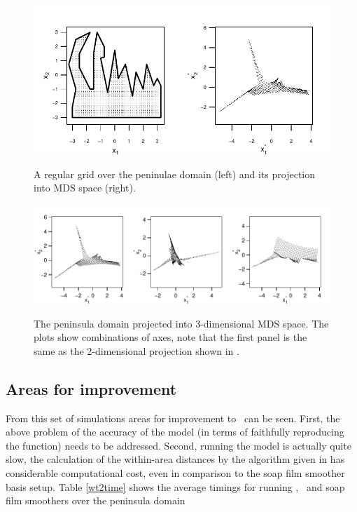 \begin{figure}
\centering
\includegraphics[width=6in]{mds/figs/wt2-2d-proj.pdf} \\
\caption{A regular grid over the peninulae domain (left) and its projection into MDS space (right).}
\label{wt2-2d-proj}
\end{figure}

\begin{figure}
\centering
\includegraphics[width=9in]{mds/figs/wt2-3d-proj.pdf} \\
\caption{The peninsula domain projected into 3-dimensional MDS space. The plots show combinations of axes, note that the first panel is the same as the 2-dimensional projection shown in .}
\label{wt2-3d-proj}
\end{figure}

\subsection{Areas for improvement}

From this set of simulations areas for improvement to \mdsap\ can be seen. First, the above problem of the accuracy of the model (in terms of faithfully reproducing the function) needs to be addressed. Second, running the model is actually quite slow, the calculation of the within-area distances by the algorithm given in  has considerable computational cost, even in comparison to the soap film smoother basis setup. Table \ref{wt2time} shows the average timings for running \mdsap, \tprs\ and soap film smoothers over the peninsula domain

